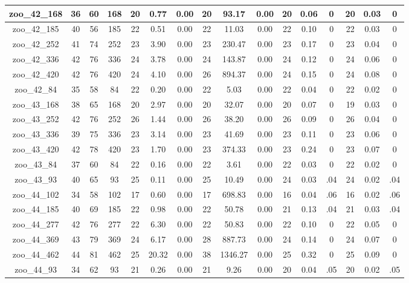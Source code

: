 \begin{landscape}
\begin{longtable}{|c|c|c|c|c|c|c|c|c|c|c|c|c|c|c|c|}
zoo\_42\_168 & 36 & 60 & 168 & 20 & 0.77 & 0.00 & 20 & 93.17 & 0.00 & 20 & 0.06 & 0 & 20 & 0.03 & 0 \\ \hline 
zoo\_42\_185 & 40 & 56 & 185 & 22 & 0.51 & 0.00 & 22 & 11.03 & 0.00 & 22 & 0.10 & 0 & 22 & 0.03 & 0 \\ \hline 
zoo\_42\_252 & 41 & 74 & 252 & 23 & 3.90 & 0.00 & 23 & 230.47 & 0.00 & 23 & 0.17 & 0 & 23 & 0.04 & 0 \\ \hline 
zoo\_42\_336 & 42 & 76 & 336 & 24 & 3.78 & 0.00 & 24 & 143.87 & 0.00 & 24 & 0.12 & 0 & 24 & 0.06 & 0 \\ \hline 
zoo\_42\_420 & 42 & 76 & 420 & 24 & 4.10 & 0.00 & 26 & 894.37 & 0.00 & 24 & 0.15 & 0 & 24 & 0.08 & 0 \\ \hline 
zoo\_42\_84 & 35 & 58 & 84 & 22 & 0.20 & 0.00 & 22 & 5.03 & 0.00 & 22 & 0.04 & 0 & 22 & 0.02 & 0 \\ \hline 
zoo\_43\_168 & 38 & 65 & 168 & 20 & 2.97 & 0.00 & 20 & 32.07 & 0.00 & 20 & 0.07 & 0 & 19 & 0.03 & 0 \\ \hline 
zoo\_43\_252 & 42 & 76 & 252 & 26 & 1.44 & 0.00 & 26 & 38.20 & 0.00 & 26 & 0.09 & 0 & 26 & 0.04 & 0 \\ \hline 
zoo\_43\_336 & 39 & 75 & 336 & 23 & 3.14 & 0.00 & 23 & 41.69 & 0.00 & 23 & 0.11 & 0 & 23 & 0.06 & 0 \\ \hline 
zoo\_43\_420 & 42 & 78 & 420 & 23 & 1.70 & 0.00 & 23 & 374.33 & 0.00 & 23 & 0.24 & 0 & 23 & 0.07 & 0 \\ \hline 
zoo\_43\_84 & 37 & 60 & 84 & 22 & 0.16 & 0.00 & 22 & 3.61 & 0.00 & 22 & 0.03 & 0 & 22 & 0.02 & 0 \\ \hline 
zoo\_43\_93 & 40 & 65 & 93 & 25 & 0.11 & 0.00 & 25 & 10.49 & 0.00 & 24 & 0.03 & .04 & 24 & 0.02 & .04 \\ \hline 
zoo\_44\_102 & 34 & 58 & 102 & 17 & 0.60 & 0.00 & 17 & 698.83 & 0.00 & 16 & 0.04 & .06 & 16 & 0.02 & .06 \\ \hline 
zoo\_44\_185 & 40 & 69 & 185 & 22 & 0.98 & 0.00 & 22 & 50.78 & 0.00 & 21 & 0.13 & .04 & 21 & 0.03 & .04 \\ \hline 
zoo\_44\_277 & 42 & 76 & 277 & 22 & 6.30 & 0.00 & 22 & 50.83 & 0.00 & 22 & 0.10 & 0 & 22 & 0.05 & 0 \\ \hline 
zoo\_44\_369 & 43 & 79 & 369 & 24 & 6.17 & 0.00 & 28 & 887.73 & 0.00 & 24 & 0.14 & 0 & 24 & 0.07 & 0 \\ \hline 
zoo\_44\_462 & 44 & 81 & 462 & 25 & 20.32 & 0.00 & 38 & 1346.27 & 0.00 & 25 & 0.32 & 0 & 25 & 0.09 & 0 \\ \hline 
zoo\_44\_93 & 34 & 62 & 93 & 21 & 0.26 & 0.00 & 21 & 9.26 & 0.00 & 20 & 0.04 & .05 & 20 & 0.02 & .05 \\ \hline 

\end{longtable}
\end{landscape}
